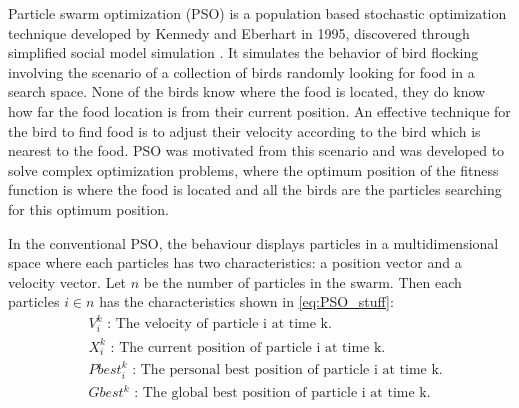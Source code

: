 \documentclass{pdfmx4020}
\begin{document}

    Particle swarm optimization (PSO) is a population based  stochastic optimization technique developed by Kennedy and  Eberhart in 1995, discovered through simplified social model simulation \cite{pso,pso2,pso3,pso4}. It simulates the behavior of bird flocking involving the scenario of a collection of birds randomly looking for food in a search space. None of the birds know where the food is located, they do know how far the food location is from their current position. An effective technique for the bird to find food is to adjust their velocity according to the bird which is nearest to the food. PSO was motivated from this scenario and was developed to solve complex optimization problems, where the optimum position of the fitness function is where the food is located and all the birds are the particles searching for this optimum position. 

    In the conventional PSO, the behaviour displays particles in a multidimensional space where each particles has two characteristics: a position vector and a velocity vector. Let $n$ be the number of particles in the swarm.  Then each particles $i \in n$ has the characteristics shown in \ref{eq:PSO_stuff}:
    \begin{equation} \label{eq:PSO_stuff}
      \begin{split}
        & V_i^k \text{ : The velocity of particle i at time k.} \\
        & X_i^k \text{ : The current position of particle i at time k.} \\
        & Pbest_i^k \text{ : The personal best position of particle i at time k.} \\
        & Gbest^k \text{ : The global best position of particle i at time k.} \\
      \end{split}
    \end{equation}
\end{document}
